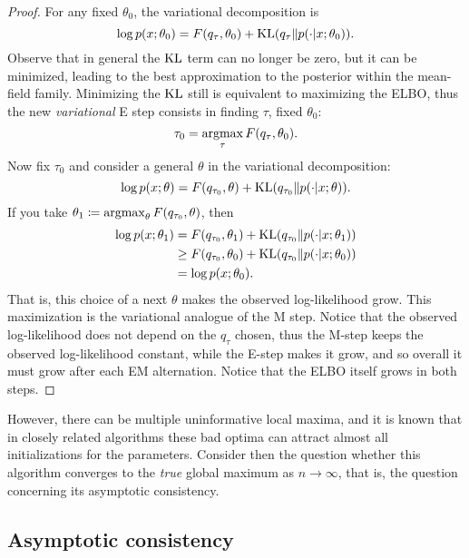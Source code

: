 \documentclass[../../main.tex]{subfiles} %
\begin{document}
\begin{proof}
	For any fixed \(\theta_0\), the variational decomposition is
	\begin{equation}
		\log p(x; \theta_0) = F(q_\tau, \theta_0) + \operatorname{KL} (q_\tau \Vert p(\cdot 
		\vert 
		x; \theta_0)).
	\end{equation}
	Observe that in general the \(\operatorname{KL}\) term can no longer be zero, but it can 
	be 
	minimized, leading to the best approximation to the posterior within the 
	mean-field family. Minimizing the \(\operatorname{KL}\) still is equivalent to maximizing 
	the 
	ELBO, thus the new \textit{variational} E step consists in finding 
	\(\tau\), 
	fixed \(\theta_0\):
	\begin{equation}
		\tau_0 = \operatorname*{argmax}_\tau F (q_\tau, \theta_0).
	\end{equation}
	Now fix \(\tau_0\) and consider a general \(\theta\) in the variational 
	decomposition:
	\begin{equation*}
		\log p(x; \theta) = F(q_{\tau_0}, \theta) + \operatorname{KL} (q_{\tau_0} \Vert 
		p(\cdot 
		\vert x; \theta)).
	\end{equation*}
	If you take \(\theta_1 \coloneqq \operatorname*{argmax}_\theta F (q_{\tau_0}, \theta)\), 
	then
	\begin{align*}
		\log p(x; \theta_1) &= F(q_{\tau_0}, \theta_1) + \operatorname{KL} (q_{\tau_0} \Vert 
		p(\cdot \vert x; \theta_1)) \\
		&\geq F(q_{\tau_0}, \theta_0) + \operatorname{KL} (q_{\tau_0} \Vert p(\cdot \vert x; 
		\theta_0)) \\
		&= \log p(x; \theta_0).
	\end{align*}
	That is, this choice of a next \(\theta\) makes the observed log-likelihood 
	grow. This maximization is the variational analogue of the M step. Notice 
	that 
	the observed log-likelihood does not depend on the \(q_\tau\) chosen, thus 
	the 
	M-step keeps the observed log-likelihood constant, while the E-step makes 
	it 
	grow, and so overall it must grow after each EM alternation. Notice that 
	the 
	ELBO itself grows in both steps.
\end{proof}

However, there can be multiple uninformative local maxima, and it is known 
\cite{sarkar_when_2021} that in closely related algorithms these bad optima can 
attract almost all initializations for the parameters. Consider then the 
question whether this algorithm converges to the \textit{true} global maximum 
as \(n \to \infty\), that is, the question concerning its asymptotic 
consistency.

\subsection{Asymptotic consistency}
\end{document}

